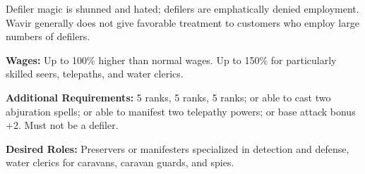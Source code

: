 Defiler magic is shunned and hated; defilers are emphatically denied employment. Wavir generally does not give favorable treatment to customers who employ large numbers of defilers.

\textbf{Wages:} Up to 100\% higher than normal wages. Up to 150\% for particularly skilled seers, telepaths, and water clerics.

\textbf{Additional Requirements:}  5 ranks,  5 ranks,  5 ranks; or able to cast two abjuration spells; or able to manifest two telepathy powers; or base attack bonus +2. Must not be a defiler.

\textbf{Desired Roles:} Preservers or manifesters specialized in detection and defense, water clerics for caravans, caravan guards, and spies.